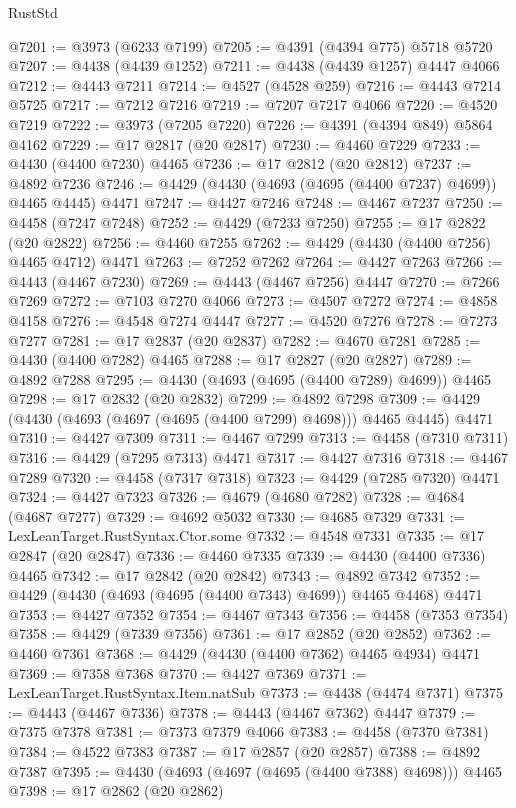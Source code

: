\begin{lexlean}{RustStd}
\begin{coremodule}
@7201 := @3973 (@6233 @7199)
@7205 := @4391 (@4394 @775) @5718 @5720
@7207 := @4438 (@4439 @1252)
@7211 := @4438 (@4439 @1257) @4447 @4066
@7212 := @4443 @7211
@7214 := @4527 (@4528 @259)
@7216 := @4443 @7214 @5725
@7217 := @7212 @7216
@7219 := @7207 @7217 @4066
@7220 := @4520 @7219
@7222 := @3973 (@7205 @7220)
@7226 := @4391 (@4394 @849) @5864 @4162
@7229 := @17 @2817 (@20 @2817)
@7230 := @4460 @7229
@7233 := @4430 (@4400 @7230) @4465
@7236 := @17 @2812 (@20 @2812)
@7237 := @4892 @7236
@7246 := @4429 (@4430 (@4693 (@4695 (@4400 @7237) @4699)) @4465 @4445) @4471
@7247 := @4427 @7246
@7248 := @4467 @7237
@7250 := @4458 (@7247 @7248)
@7252 := @4429 (@7233 @7250)
@7255 := @17 @2822 (@20 @2822)
@7256 := @4460 @7255
@7262 := @4429 (@4430 (@4400 @7256) @4465 @4712) @4471
@7263 := @7252 @7262
@7264 := @4427 @7263
@7266 := @4443 (@4467 @7230)
@7269 := @4443 (@4467 @7256) @4447
@7270 := @7266 @7269
@7272 := @7103 @7270 @4066
@7273 := @4507 @7272
@7274 := @4858 @4158
@7276 := @4548 @7274 @4447
@7277 := @4520 @7276
@7278 := @7273 @7277
@7281 := @17 @2837 (@20 @2837)
@7282 := @4670 @7281
@7285 := @4430 (@4400 @7282) @4465
@7288 := @17 @2827 (@20 @2827)
@7289 := @4892 @7288
@7295 := @4430 (@4693 (@4695 (@4400 @7289) @4699)) @4465
@7298 := @17 @2832 (@20 @2832)
@7299 := @4892 @7298
@7309 := @4429 (@4430 (@4693 (@4697 (@4695 (@4400 @7299) @4698))) @4465 @4445) @4471
@7310 := @4427 @7309
@7311 := @4467 @7299
@7313 := @4458 (@7310 @7311)
@7316 := @4429 (@7295 @7313) @4471
@7317 := @4427 @7316
@7318 := @4467 @7289
@7320 := @4458 (@7317 @7318)
@7323 := @4429 (@7285 @7320) @4471
@7324 := @4427 @7323
@7326 := @4679 (@4680 @7282)
@7328 := @4684 (@4687 @7277)
@7329 := @4692 @5032
@7330 := @4685 @7329
@7331 := LexLeanTarget.RustSyntax.Ctor.some
@7332 := @4548 @7331
@7335 := @17 @2847 (@20 @2847)
@7336 := @4460 @7335
@7339 := @4430 (@4400 @7336) @4465
@7342 := @17 @2842 (@20 @2842)
@7343 := @4892 @7342
@7352 := @4429 (@4430 (@4693 (@4695 (@4400 @7343) @4699)) @4465 @4468) @4471
@7353 := @4427 @7352
@7354 := @4467 @7343
@7356 := @4458 (@7353 @7354)
@7358 := @4429 (@7339 @7356)
@7361 := @17 @2852 (@20 @2852)
@7362 := @4460 @7361
@7368 := @4429 (@4430 (@4400 @7362) @4465 @4934) @4471
@7369 := @7358 @7368
@7370 := @4427 @7369
@7371 := LexLeanTarget.RustSyntax.Item.natSub
@7373 := @4438 (@4474 @7371)
@7375 := @4443 (@4467 @7336)
@7378 := @4443 (@4467 @7362) @4447
@7379 := @7375 @7378
@7381 := @7373 @7379 @4066
@7383 := @4458 (@7370 @7381)
@7384 := @4522 @7383
@7387 := @17 @2857 (@20 @2857)
@7388 := @4892 @7387
@7395 := @4430 (@4693 (@4697 (@4695 (@4400 @7388) @4698))) @4465
@7398 := @17 @2862 (@20 @2862)

\end{coremodule}
\end{lexlean}
